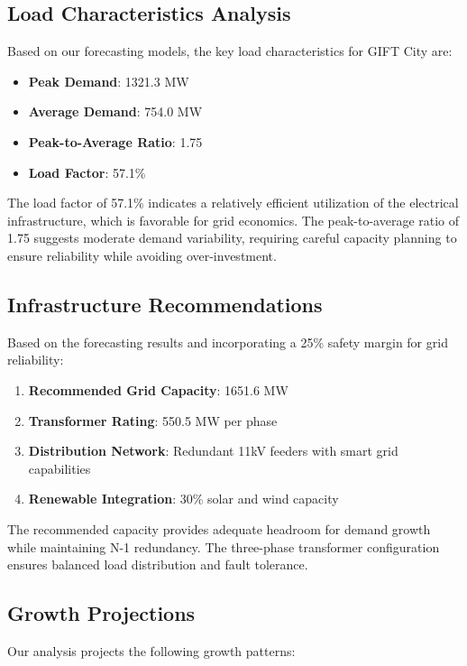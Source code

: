 \documentclass[12pt,a4paper]{article}
\begin{document}
\subsection{Load Characteristics Analysis}
Based on our forecasting models, the key load characteristics for GIFT City are:

\begin{itemize}
    \item \textbf{Peak Demand}: 1321.3 MW
    \item \textbf{Average Demand}: 754.0 MW
    \item \textbf{Peak-to-Average Ratio}: 1.75
    \item \textbf{Load Factor}: 57.1\%
\end{itemize}

The load factor of 57.1\% indicates a relatively efficient utilization of the electrical infrastructure, which is favorable for grid economics. The peak-to-average ratio of 1.75 suggests moderate demand variability, requiring careful capacity planning to ensure reliability while avoiding over-investment.

\subsection{Infrastructure Recommendations}
Based on the forecasting results and incorporating a 25\% safety margin for grid reliability:

\begin{enumerate}
    \item \textbf{Recommended Grid Capacity}: 1651.6 MW
    \item \textbf{Transformer Rating}: 550.5 MW per phase
    \item \textbf{Distribution Network}: Redundant 11kV feeders with smart grid capabilities
    \item \textbf{Renewable Integration}: 30\% solar and wind capacity
\end{enumerate}

The recommended capacity provides adequate headroom for demand growth while maintaining N-1 redundancy. The three-phase transformer configuration ensures balanced load distribution and fault tolerance.

\subsection{Growth Projections}
Our analysis projects the following growth patterns:
\end{document}

